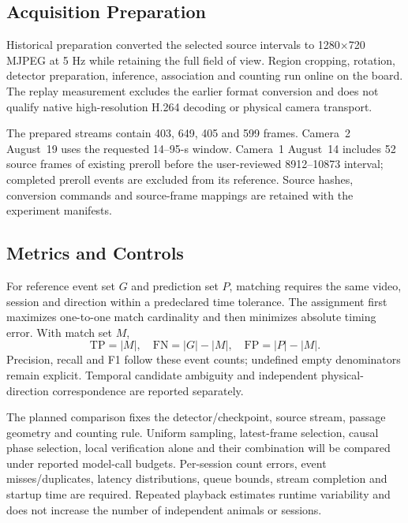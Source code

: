 \documentclass[journal]{IEEEtran}
\begin{document}
\subsection{Acquisition Preparation}
Historical preparation converted the selected source intervals to 1280$\times$720 MJPEG at 5 Hz while retaining the full field of view. Region cropping, rotation, detector preparation, inference, association and counting run online on the board. The replay measurement excludes the earlier format conversion and does not qualify native high-resolution H.264 decoding or physical camera transport.

The prepared streams contain 403, 649, 405 and 599 frames. Camera~2 August~19 uses the requested 14--95-s window. Camera~1 August~14 includes 52 source frames of existing preroll before the user-reviewed 8912--10873 interval; completed preroll events are excluded from its reference. Source hashes, conversion commands and source-frame mappings are retained with the experiment manifests.

\subsection{Metrics and Controls}
For reference event set $G$ and prediction set $P$, matching requires the same video, session and direction within a predeclared time tolerance. The assignment first maximizes one-to-one match cardinality and then minimizes absolute timing error. With match set $M$,
\begin{equation}
\mathrm{TP}=|M|,\quad \mathrm{FN}=|G|-|M|,\quad \mathrm{FP}=|P|-|M|.
\end{equation}
Precision, recall and F1 follow these event counts; undefined empty denominators remain explicit. Temporal candidate ambiguity and independent physical-direction correspondence are reported separately.

The planned comparison fixes the detector/checkpoint, source stream, passage geometry and counting rule. Uniform sampling, latest-frame selection, causal phase selection, local verification alone and their combination will be compared under reported model-call budgets. Per-session count errors, event misses/duplicates, latency distributions, queue bounds, stream completion and startup time are required. Repeated playback estimates runtime variability and does not increase the number of independent animals or sessions.
\end{document}

